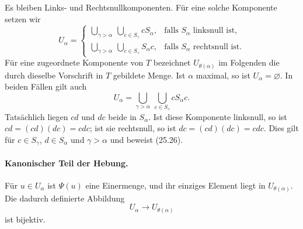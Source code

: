 \documentclass[main.tex]{subfiles}
\begin{document}
Es bleiben Links- und Rechtsnullkomponenten.  Für eine solche Komponente
setzen wir
\[
U_\alpha=\begin{cases}
\displaystyle
 \bigcup_{\gamma>\alpha}\ \bigcup_{c\in S_\gamma}cS_\alpha,
   &\text{falls }S_\alpha\text{ linksnull ist},\\[3mm]
\displaystyle
 \bigcup_{\gamma>\alpha}\ \bigcup_{c\in S_\gamma}S_\alpha c,
   &\text{falls }S_\alpha\text{ rechtsnull ist}.
\end{cases}                                                \tag{25.25}
\]
Für eine zugeordnete Komponente von \(T\) bezeichnet
\(U_{\theta(\alpha)}\) im Folgenden die durch dieselbe Vorschrift in
\(T\) gebildete Menge.
Ist \(\alpha\) maximal, so ist \(U_\alpha=\varnothing\).  In beiden
Fällen gilt auch
\[
 U_\alpha=
 \bigcup_{\gamma>\alpha}\ \bigcup_{c\in S_\gamma}cS_\alpha c.  \tag{25.26}
\]
  Tatsächlich liegen \(cd\) und \(dc\) beide in \(S_\alpha\).  Ist diese
  Komponente linksnull, so ist
  \(cd=(cd)(dc)=cdc\); ist sie rechtsnull, so ist
  \(dc=(cd)(dc)=cdc\).  Dies gilt für
  \(c\in S_\gamma\), \(d\in S_\alpha\) und \(\gamma>\alpha\) und beweist
  (25.26).

\paragraph{Kanonischer Teil der Hebung.}
Für \(u\in U_\alpha\) ist \(\Psi(u)\) eine Einermenge, und ihr einziges
Element liegt in \(U_{\theta(\alpha)}\).  Die dadurch definierte Abbildung
\[
 U_\alpha\longrightarrow U_{\theta(\alpha)}              \tag{25.27}
\]
ist bijektiv.
\end{document}
